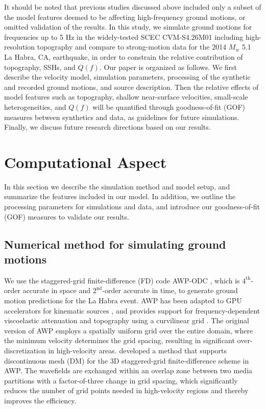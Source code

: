 It should be noted that previous studies discussed above included only a subset of the model features deemed to be affecting high-frequency ground motions, or omitted validation of the results. In this study, we simulate ground motions for frequencies up to 5 Hz in the widely-tested SCEC CVM-S4.26M01 including high-resolution topography and compare to strong-motion data for the 2014 $M_w$ 5.1 La Habra, CA, earthquake, in order to constrain the relative contribution of topography, SSHs, and $Q(f)$. Our paper is organized as follows. We first describe the velocity model, simulation parameters, processing of the synthetic and recorded ground motions, and source description. Then the relative effects of model features such as topography, shallow near-surface velocities, small-scale heterogeneities, and $Q(f)$ will be quantified through goodness-of-fit (GOF) measures between synthetics and data, as guidelines for future simulations. Finally, we discuss future research directions based on our results.



\section{Computational Aspect}\label{approach}

In this section we describe the simulation method and model setup, and summarize the features included in our model. In addition, we outline the processing parameters for simulations and data, and introduce our goodness-of-fit (GOF) measures to validate our results.

\subsection{Numerical method for simulating ground motions}
We use the staggered-grid finite-difference (FD) code AWP-ODC \citep[Anelastic Wave Propagation, Olsen-Day-Cui, from the authors of the code, hereafter denoted by AWP;][]{cuiScalableEarthquakeSimulation2010}, which is $4^{\text{th}}$-order accurate in space and $2^{\text{nd}}$-order accurate in time, to generate ground motion predictions for the La Habra event. AWP has been adapted to GPU accelerators for kinematic sources \citep{cui2013physics}, and provides support for frequency-dependent viscoelastic attenuation \citep{withersMemoryEfficientSimulation2015} and topography using a curvilinear grid \citep{oreillySimulationElasticWaves2019}. The original version of AWP employs a spatially uniform grid over the entire domain, where the minimum velocity determines the grid spacing, resulting in significant over-discretization in high-velocity areas. \citet{nieFourthOrderStaggered2017} developed a method that supports discontinuous mesh (DM) for the 3D staggered-grid finite-difference scheme in AWP. The wavefields are exchanged within an overlap zone between two media partitions with a factor-of-three change in grid spacing, which significantly reduces the number of grid points needed in high-velocity regions and thereby improves the efficiency.

